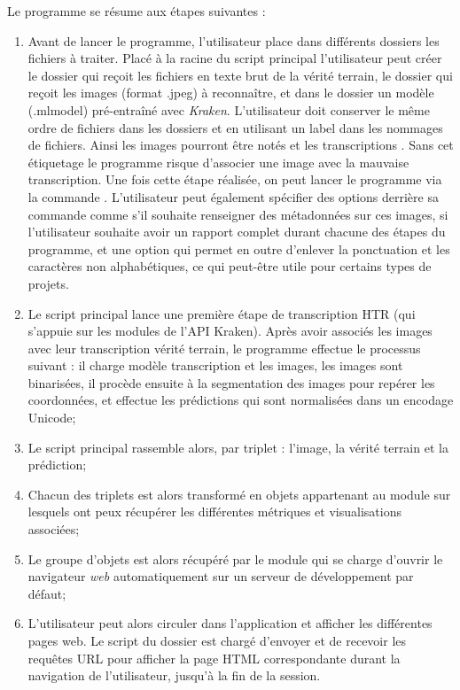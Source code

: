 Le programme se résume aux étapes suivantes :
\begin{enumerate}
    \item Avant de lancer le programme, l'utilisateur place dans différents dossiers les fichiers à traiter. 
    Placé à la racine du script principal  l'utilisateur peut créer le dossier  qui reçoit les fichiers en texte brut de la vérité terrain, le dossier  qui reçoit les images (format .jpeg) à reconnaître, et dans le dossier  un modèle (.mlmodel) pré-entraîné avec \textit{Kraken}. L'utilisateur doit conserver le même ordre de fichiers dans les dossiers  et  en utilisant un label dans les nommages de fichiers. Ainsi les images pourront être notés  et les transcriptions . Sans cet étiquetage le programme risque d'associer une image avec la mauvaise transcription. Une fois cette étape réalisée, on peut lancer le programme via la commande . L'utilisateur peut également spécifier des options derrière sa commande comme  s'il souhaite renseigner des métadonnées sur ces images,  si l'utilisateur souhaite avoir un rapport complet durant chacune des étapes du programme, et une option  qui permet en outre d'enlever la ponctuation et les caractères non alphabétiques, ce qui peut-être utile pour certains types de projets.\\
    \item Le script principal  lance une première étape de transcription HTR (qui s'appuie sur les modules de l'API Kraken). Après avoir associés les images avec leur transcription vérité terrain, le programme effectue le processus suivant : il charge modèle transcription et les images, les images sont binarisées, il procède ensuite à la segmentation des images pour repérer les coordonnées, et effectue les prédictions qui sont normalisées dans un encodage Unicode;
    \item Le script principal  rassemble alors, par triplet : l'image, la vérité terrain et la prédiction;
    \item Chacun des triplets est alors transformé en objets  appartenant au module  sur lesquels ont peux récupérer les différentes métriques et visualisations associées;
    \item Le groupe d'objets est alors récupéré par le module  qui se charge d'ouvrir le navigateur \textit{web} automatiquement sur un serveur de développement par défaut;
    \item L'utilisateur peut alors circuler dans l'application et afficher les différentes pages web. Le script  du dossier  est chargé d'envoyer et de recevoir les requêtes URL pour afficher la page HTML correspondante durant la navigation de l'utilisateur, jusqu'à la fin de la session.
\end{enumerate}

